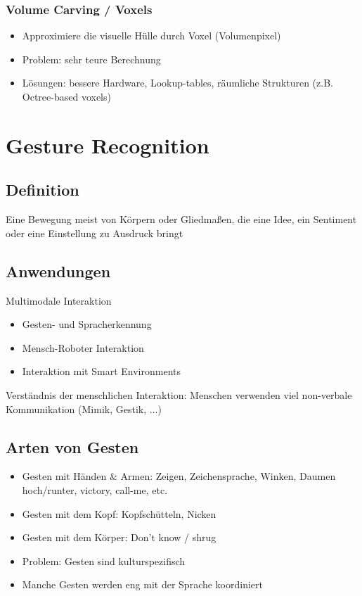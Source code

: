 \documentclass[paper=a4, fontsize=11pt]{scrartcl} %
\numberwithin{equation}{section} %
\numberwithin{figure}{section} %
\numberwithin{table}{section} %
\begin{document}
\subsubsection{Volume Carving / Voxels}

\begin{itemize}
\item Approximiere die visuelle Hülle durch Voxel (Volumenpixel)
\item Problem: sehr teure Berechnung
\item Lösungen: bessere Hardware, Lookup-tables, räumliche Strukturen (z.B. Octree-based voxels)
\end{itemize}

\section{Gesture Recognition}

\subsection{Definition}

Eine Bewegung meist von Körpern oder Gliedmaßen, die eine Idee, ein Sentiment oder eine Einstellung zu Ausdruck bringt

\subsection{Anwendungen}

Multimodale Interaktion
\begin{itemize}
\item Gesten- und Spracherkennung
\item Mensch-Roboter Interaktion
\item Interaktion mit Smart Environments
\end{itemize}

Verständnis der menschlichen Interaktion: Menschen verwenden viel non-verbale Kommunikation (Mimik, Gestik, ...)

\subsection{Arten von Gesten}

\begin{itemize}
\item Gesten mit Händen \& Armen: Zeigen, Zeichensprache, Winken, Daumen hoch/runter, victory, call-me, etc.
\item Gesten mit dem Kopf: Kopfschütteln, Nicken
\item Gesten mit dem Körper: Don't know / shrug
\item Problem: Gesten sind kulturspezifisch
\item Manche Gesten werden eng mit der Sprache koordiniert
\end{itemize}
\end{document}
